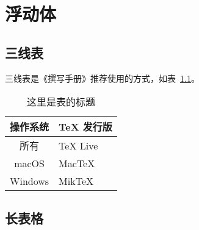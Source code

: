 \chapter{浮动体}

\section{三线表}

三线表是《撰写手册》推荐使用的方式，如表~\ref{tab:exampletable}。
\begin{table}[htbp]
  \centering
  \caption{这里是表的标题}
  \label{tab:exampletable}
  \begin{tabular}{cl}
    \toprule
      操作系统 & TeX 发行版 \\
    \midrule
      所有 & TeX Live \\
      macOS & MacTeX \\
      Windows & MikTeX \\
    \bottomrule
  \end{tabular}
\end{table}



\section{长表格}


